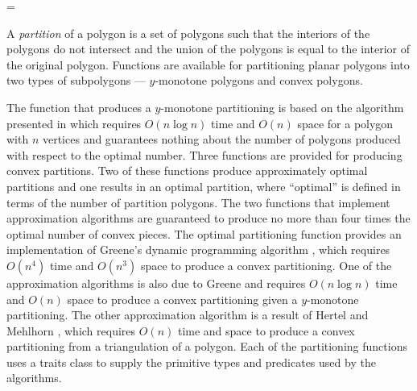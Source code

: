 


\ccEnableRawListOfRefpages


\begin{ccTexOnly}
\ifnum\ccNewRefManualStyle=\ccTrue
\end{ccTexOnly}
A {\em partition} of a polygon is a set 
of polygons such that the interiors of the polygons do not intersect and 
the union of the polygons is equal to the interior of the original polygon.
Functions are available for partitioning planar polygons into two 
types of subpolygons --- $y$-monotone polygons and convex polygons.  

The function that produces a $y$-monotone partitioning is based on the 
algorithm presented in \cite{bkos-cgaa-97} which requires $O(n \log n)$ time 
and $O(n)$ space for a polygon with $n$ vertices and guarantees nothing 
about the number of polygons produced with respect to the optimal number.
Three functions are provided for producing
convex partitions. Two of these functions produce approximately optimal 
partitions and one results in an optimal partition, where ``optimal'' is
defined in terms of the number of partition polygons.   The two functions
that implement approximation algorithms are guaranteed to produce no more 
than four times the optimal number of convex pieces.  The optimal partitioning
function provides an implementation of Greene's dynamic programming algorithm
\cite{g-dpcp-83}, which requires $O(n^4)$ time and $O(n^3)$ space to produce a 
convex partitioning. One of the approximation algorithms is also due to 
Greene \cite{g-dpcp-83} and requires $O(n \log n)$ time and $O(n)$ space
to produce a convex partitioning given a $y$-monotone partitioning.  The
other approximation algorithm is a result of Hertel and
Mehlhorn \cite{hm-ftsp-83}, which requires $O(n)$ time and space to produce
a convex partitioning from a triangulation of a polygon.
Each of the partitioning functions uses a traits class to supply the
primitive types and predicates used by the algorithms.
\begin{ccTexOnly}
\fi
\end{ccTexOnly}



